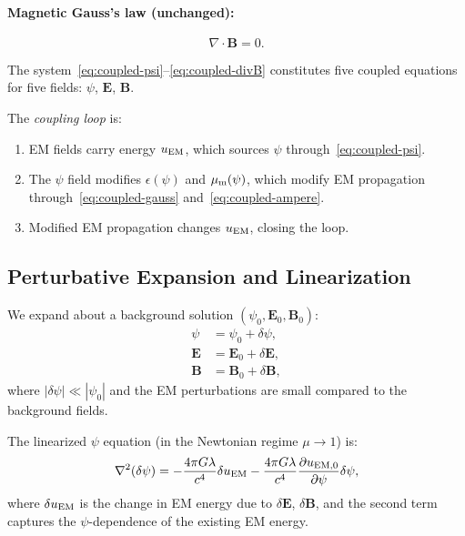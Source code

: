 \documentclass[aps,prd,twocolumn,superscriptaddress,floatfix,nofootinbib]{revtex4-2}
\newcommand{\mufunction}{\mu}
\newcommand{\lam}{\lambda}
\begin{document}
\paragraph{Magnetic Gauss's law (unchanged):}
\begin{equation}
\nabla\cdot\mathbf{B} = 0.
\label{eq:coupled-divB}
\end{equation}

The system~\eqref{eq:coupled-psi}--\eqref{eq:coupled-divB} constitutes
five coupled equations for five fields: $\psi$, $\mathbf{E}$,
$\mathbf{B}$.

The \emph{coupling loop} is:
\begin{enumerate}[nosep]
\item EM fields carry energy $u_{\rm EM}$, which sources $\psi$
through~\eqref{eq:coupled-psi}.
\item The $\psi$ field modifies $\epsilon(\psi)$ and $\mu_{\rm m}(\psi)$,
which modify EM propagation through~\eqref{eq:coupled-gauss}
and~\eqref{eq:coupled-ampere}.
\item Modified EM propagation changes $u_{\rm EM}$, closing the loop.
\end{enumerate}

\subsection{Perturbative Expansion and Linearization}
\label{sec:perturbative}

We expand about a background solution
$(\psi_0, \mathbf{E}_0, \mathbf{B}_0)$:
\begin{align}
\psi &= \psi_0 + \delta\psi, \\
\mathbf{E} &= \mathbf{E}_0 + \delta\mathbf{E}, \\
\mathbf{B} &= \mathbf{B}_0 + \delta\mathbf{B},
\end{align}
where $|\delta\psi| \ll |\psi_0|$ and the EM perturbations are small
compared to the background fields.

The linearized $\psi$ equation (in the Newtonian regime
$\mufunction \to 1$) is:
\begin{equation}
\nabla^2(\delta\psi) = -\frac{4\pi G\lam}{c^4}
\delta u_{\rm EM}
- \frac{4\pi G\lam}{c^4}\frac{\partial u_{\rm EM,0}}
{\partial\psi}\delta\psi,
\label{eq:lin-psi}
\end{equation}
where $\delta u_{\rm EM}$ is the change in EM energy due to
$\delta\mathbf{E}$, $\delta\mathbf{B}$, and the second term captures
the $\psi$-dependence of the existing EM energy.
\end{document}
